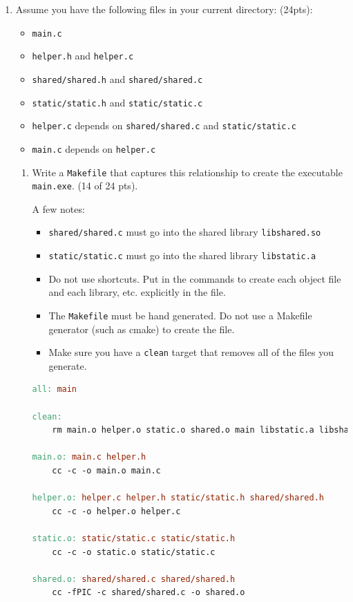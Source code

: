 \documentclass[10pt]{article}
\begin{document}
\begin{enumerate}
\item Assume you have the following files in your current directory: (24pts):

\begin{itemize}
	\item \verb*|main.c|
	\item \verb*|helper.h| and \verb*|helper.c|
	\item \verb*|shared/shared.h| and \verb*|shared/shared.c|
	\item \verb*|static/static.h| and \verb*|static/static.c|
	\item \verb*|helper.c| depends on \verb*|shared/shared.c| and \verb*|static/static.c|
	\item \verb*|main.c| depends on \verb*|helper.c|
\end{itemize}

\begin{enumerate}
\item Write a \verb*|Makefile| that captures this relationship to create the executable \verb*|main.exe|.  (14 of 24 pts).

A few notes:
\begin{itemize}
	\item \verb*|shared/shared.c| must go into the shared library \verb*|libshared.so|
	\item \verb*|static/static.c| must go into the shared library \verb*|libstatic.a|
	\item Do not use shortcuts. Put in the commands to create each object file and each library, etc. explicitly in the file.
	\item The \verb*|Makefile| must be hand generated. Do not use a Makefile generator (such as cmake) to create the file.
	\item Make sure you have a \verb*|clean| target that removes all of the files you generate.
\end{itemize}
\beginanswers
\begin{lstlisting}[language=make]
all: main

clean:
	rm main.o helper.o static.o shared.o main libstatic.a libshared.so

main.o: main.c helper.h
	cc -c -o main.o main.c

helper.o: helper.c helper.h static/static.h shared/shared.h
	cc -c -o helper.o helper.c

static.o: static/static.c static/static.h
	cc -c -o static.o static/static.c

shared.o: shared/shared.c shared/shared.h
	cc -fPIC -c shared/shared.c -o shared.o


\end{lstlisting}
\end{enumerate}
\end{enumerate}
\end{document}
